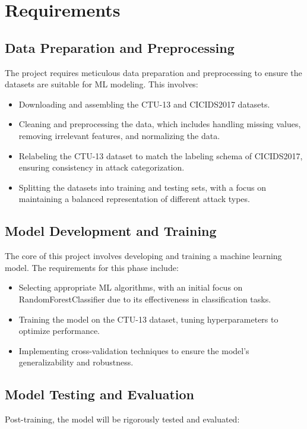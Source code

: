 \chapter{Requirements}

\section{Data Preparation and Preprocessing}
The project requires meticulous data preparation and preprocessing to ensure the datasets are suitable for ML modeling. This involves:

\begin{itemize}
    \item Downloading and assembling the CTU-13 and CICIDS2017 datasets.
    \item Cleaning and preprocessing the data, which includes handling missing values, removing irrelevant features, and normalizing the data.
    \item Relabeling the CTU-13 dataset to match the labeling schema of CICIDS2017, ensuring consistency in attack categorization.
    \item Splitting the datasets into training and testing sets, with a focus on maintaining a balanced representation of different attack types.
\end{itemize}

\section{Model Development and Training}
The core of this project involves developing and training a machine learning model. The requirements for this phase include:

\begin{itemize}
    \item Selecting appropriate ML algorithms, with an initial focus on RandomForestClassifier due to its effectiveness in classification tasks.
    \item Training the model on the CTU-13 dataset, tuning hyperparameters to optimize performance.
    \item Implementing cross-validation techniques to ensure the model's generalizability and robustness.
\end{itemize}

\section{Model Testing and Evaluation}
Post-training, the model will be rigorously tested and evaluated:

